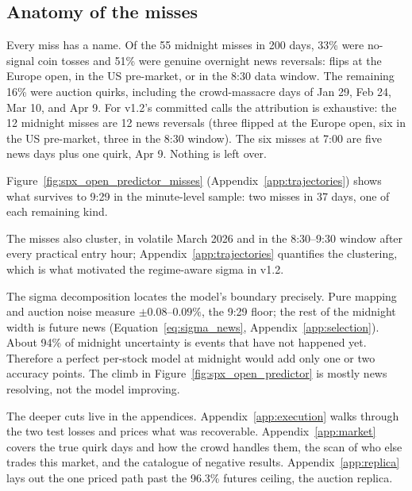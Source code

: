 \label{sec:discussion}

\subsection{Anatomy of the misses}

Every miss has a name. Of the 55 midnight misses in 200 days, 33\% were
no-signal coin tosses and 51\% were genuine overnight news reversals:
flips at the Europe open, in the US pre-market, or in the 8:30 data
window. The remaining 16\% were auction quirks, including the
crowd-massacre days of Jan 29, Feb 24, Mar 10, and Apr 9. For v1.2's
committed calls the attribution is exhaustive: the 12 midnight misses are
12 news reversals (three flipped at the Europe open, six in the US
pre-market, three in the 8:30 window). The six misses at 7:00 are five
news days plus one quirk, Apr 9. Nothing is left over.

Figure~\ref{fig:spx_open_predictor_misses}
(Appendix~\ref{app:trajectories}) shows what survives to 9:29 in
the minute-level sample: two misses in 37 days, one of each remaining
kind.

The misses also cluster, in volatile March 2026 and in the 8:30--9:30
window after every practical entry hour;
Appendix~\ref{app:trajectories} quantifies the clustering, which is what
motivated the regime-aware sigma in v1.2.

The sigma decomposition locates the model's boundary precisely. Pure
mapping and auction noise measure $\pm 0.08$--$0.09\%$, the 9:29 floor;
the rest of the midnight width is future news
(Equation~\ref{eq:sigma_news}, Appendix~\ref{app:selection}). About 94\%
of midnight
uncertainty is events that have not happened yet. Therefore a perfect
per-stock model at midnight would add only one or two accuracy points.
The climb in Figure~\ref{fig:spx_open_predictor} is mostly news
resolving, not the model improving.

The deeper cuts live in the appendices. Appendix~\ref{app:execution}
walks through the two test losses and prices what was recoverable.
Appendix~\ref{app:market} covers the true quirk days and how the crowd
handles them, the scan of who else trades this market, and the catalogue
of negative results. Appendix~\ref{app:replica} lays out the one priced
path past the 96.3\% futures ceiling, the auction replica.


